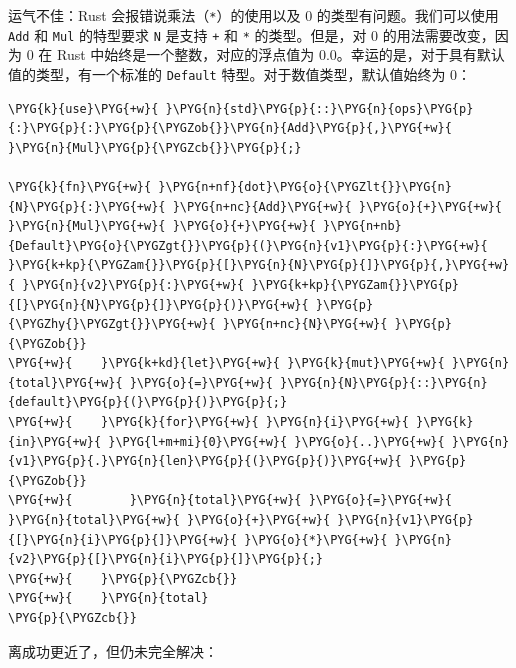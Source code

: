 运气不佳：Rust 会报错说乘法（\texttt{*}）的使用以及 0 的类型有问题。我们可以使用 \texttt{Add} 和 \texttt{Mul} 的特型要求 \texttt{N} 是支持 \texttt{+} 和 \texttt{*} 的类型。但是，对 0 的用法需要改变，因为 0 在 Rust 中始终是一个整数，对应的浮点值为 0.0。幸运的是，对于具有默认值的类型，有一个标准的 \texttt{Default} 特型。对于数值类型，默认值始终为 0：

\begin{Verbatim}[commandchars=\\\{\},breaklines=true,breakanywhere=true,fontsize=\codefont,xleftmargin=17bp]
\PYG{k}{use}\PYG{+w}{ }\PYG{n}{std}\PYG{p}{::}\PYG{n}{ops}\PYG{p}{:}\PYG{p}{:}\PYG{p}{\PYGZob{}}\PYG{n}{Add}\PYG{p}{,}\PYG{+w}{ }\PYG{n}{Mul}\PYG{p}{\PYGZcb{}}\PYG{p}{;}

\PYG{k}{fn}\PYG{+w}{ }\PYG{n+nf}{dot}\PYG{o}{\PYGZlt{}}\PYG{n}{N}\PYG{p}{:}\PYG{+w}{ }\PYG{n+nc}{Add}\PYG{+w}{ }\PYG{o}{+}\PYG{+w}{ }\PYG{n}{Mul}\PYG{+w}{ }\PYG{o}{+}\PYG{+w}{ }\PYG{n+nb}{Default}\PYG{o}{\PYGZgt{}}\PYG{p}{(}\PYG{n}{v1}\PYG{p}{:}\PYG{+w}{ }\PYG{k+kp}{\PYGZam{}}\PYG{p}{[}\PYG{n}{N}\PYG{p}{]}\PYG{p}{,}\PYG{+w}{ }\PYG{n}{v2}\PYG{p}{:}\PYG{+w}{ }\PYG{k+kp}{\PYGZam{}}\PYG{p}{[}\PYG{n}{N}\PYG{p}{]}\PYG{p}{)}\PYG{+w}{ }\PYG{p}{\PYGZhy{}\PYGZgt{}}\PYG{+w}{ }\PYG{n+nc}{N}\PYG{+w}{ }\PYG{p}{\PYGZob{}}
\PYG{+w}{    }\PYG{k+kd}{let}\PYG{+w}{ }\PYG{k}{mut}\PYG{+w}{ }\PYG{n}{total}\PYG{+w}{ }\PYG{o}{=}\PYG{+w}{ }\PYG{n}{N}\PYG{p}{::}\PYG{n}{default}\PYG{p}{(}\PYG{p}{)}\PYG{p}{;}
\PYG{+w}{    }\PYG{k}{for}\PYG{+w}{ }\PYG{n}{i}\PYG{+w}{ }\PYG{k}{in}\PYG{+w}{ }\PYG{l+m+mi}{0}\PYG{+w}{ }\PYG{o}{..}\PYG{+w}{ }\PYG{n}{v1}\PYG{p}{.}\PYG{n}{len}\PYG{p}{(}\PYG{p}{)}\PYG{+w}{ }\PYG{p}{\PYGZob{}}
\PYG{+w}{        }\PYG{n}{total}\PYG{+w}{ }\PYG{o}{=}\PYG{+w}{ }\PYG{n}{total}\PYG{+w}{ }\PYG{o}{+}\PYG{+w}{ }\PYG{n}{v1}\PYG{p}{[}\PYG{n}{i}\PYG{p}{]}\PYG{+w}{ }\PYG{o}{*}\PYG{+w}{ }\PYG{n}{v2}\PYG{p}{[}\PYG{n}{i}\PYG{p}{]}\PYG{p}{;}
\PYG{+w}{    }\PYG{p}{\PYGZcb{}}
\PYG{+w}{    }\PYG{n}{total}
\PYG{p}{\PYGZcb{}}
\end{Verbatim}

离成功更近了，但仍未完全解决：

